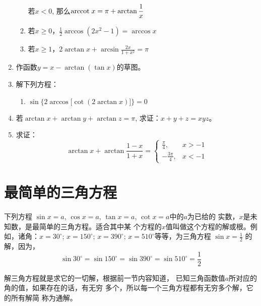 \begin{enumerate}
\begin{enumerate}
若$x<0$, 那么${\rm arccot\; } x=\pi+\arctan\dfrac{1}{x}$

\item 若$x\ge 0$，$\frac{1}{2}\arccos(2x^2-1)=\arccos x$
\item 若$x\ge 1$，$2\arctan x+\arcsin\frac{2x}{1+x^2}=\pi$
\end{enumerate}

\item 作函数$y=x-\arctan(\tan x)$的草图。

\item 解下列方程：
\begin{enumerate}
    \item $\sin\Big\{2\arccos\big[\cot(2\arctan x)\big]\Big\}=0$
\end{enumerate}

\item 若$\arctan x+\arctan y+ \arctan z=\pi$, 
求证：$x+y+z=xyz$。

\item 求证：
\[\arctan x+\arctan\frac{1-x}{1+x}=\begin{cases}
    \frac{\pi}{4},& x>-1\\
    -\frac{3\pi}{4},& x<-1
\end{cases}\]
\end{enumerate}

\section{最简单的三角方程}
下列方程
$\sin x=a$, $\cos x=a$, $\tan x=a$, $\cot x=a$中的$a$为已给的
实数，$x$是未知数，是最简单的三角方程。适合其中某
个方程的$x$值叫做这个方程的解或根。例如，诸角：$x=
30^{\circ}$; $x=150^{\circ}$; $x=390^{\circ}$; $x=510^{\circ}$等等，为三角方程
$\sin x=\frac{1}{2}$
的解，因为，\[\sin30^{\circ}=\sin150^{\circ}=\sin390^{\circ}=\sin510^{\circ}=\frac{1}{2}\]

解三角方程就是求它的一切解，根据前一节内容知道，
已知三角函数值$a$所对应的角的值，如果存在的话，有无穷
多个，所以每一个三角方程都有无穷多个解，它的所有解简
称为通解。

